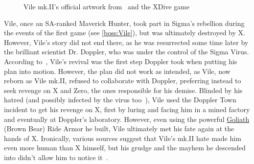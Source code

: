\begin{figure}[htp]
	\caption{Vile mk.II's official artwork from~\cite{book:MMX_Complete_art} and the XDive game}
\end{figure}

Vile, once an SA-ranked Maverick Hunter, took part in Sigma's rebellion during the events of the first game (see \ref{boss:Vile}), but was ultimately destroyed by X. However, Vile's story did not end there, as he was resurrected some time later by the brilliant scientist Dr. Doppler, who was under the control of the Sigma Virus. According to~\cite{X3:Manual}, Vile's revival was the first step Doppler took when putting his plan into motion. However, the plan did not work as intended, as Vile, now reborn as Vile mk.II, refused to collaborate with Doppler, preferring instead to seek revenge on X and Zero, the ones responsible for his demise. Blinded by his hatred (and possibly infected by the virus too~\cite{X3:Manual}), Vile used the Doppler Town incident to get his revenge on X, first by luring and facing him in a mined factory and eventually at Doppler's laboratory. However, even using the powerful \hyperlink{vehicle:Ride_Armor_Goliath}{Goliath} (Brown Bear) Ride Armor he built, Vile ultimately met his fate again at the hands of X. Ironically, various sources suggest that Vile's mk.II hate made him even more human than X himself, but his grudge and the mayhem he descended into didn't allow him to notice it~\cite{Xcoll1:Manual_X3,wayback:X3_resources}.

